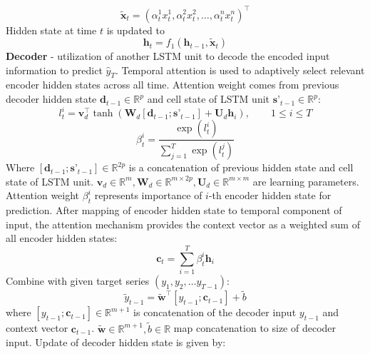 \documentclass{article}
\begin{document}
\begin{equation}
    \tilde{\textbf{x}}_{t} = (\alpha_{t}^{1}x_{t}^{1}, \alpha_{t}^{2}x_{t}^{2}, \hdots, \alpha_{t}^{n}x_{t}^{n})^{\intercal}
\end{equation}
Hidden state at time $t$ is updated to
\begin{equation}
    \textbf{h}_{t} = f_{1}(\textbf{h}_{t-1}, \tilde{\textbf{x}}_{t})
\end{equation}
\textbf{Decoder} - utilization of another LSTM unit to decode the encoded input information to predict $\hat{y}_{T}$. \newpage \noindent
Temporal attention is used to adaptively select relevant encoder hidden states across all time. Attention weight comes from previous decoder hidden state $\textbf{d}_{t-1} \in \mathbb{R}^{p}$ and cell state of LSTM unit $
\textbf{s'}_{t-1} \in \mathbb{R}^{p}$:
\begin{equation}
    l_{t}^{i} = \textbf{v}_{d}^{\intercal}\tanh(\textbf{W}_{d}[\textbf{d}_{t-1}; \textbf{s'}_{t-1}] + \textbf{U}_{d}\textbf{h}_{i}), \hspace{25pt} 1 \leq i \leq T
\end{equation}
\begin{equation}
    \beta_{t}^{i} = \frac{ \exp(l_{t}^{i})}{\sum_{j=1}^{T} \exp(l_{t}^{j})}
\end{equation}
Where $[\textbf{d}_{t-1}; \textbf{s'}_{t-1}] \in \mathbb{R}^{2p}$ is a concatenation of previous hidden state and cell state of LSTM unit. $\textbf{v}_{d} \in \mathbb{R}^{m}, \textbf{W}_{d} \in \mathbb{R}^{m \times 2p}, \textbf{U}_{d} \in \mathbb{R}^{m \times m}$ are learning parameters. Attention weight $\beta_{t}^{i}$ represents importance of $i$-th encoder hidden state for prediction. \newline
After mapping of encoder hidden state to temporal component of input, the attention mechanism provides the context vector as a weighted sum of all encoder hidden states:
\begin{equation}
    \textbf{c}_{t} = \sum_{i=1}^{T} \beta_{t}^{i}\textbf{h}_{i}
\end{equation}
Combine with given target series $(y_{1}, y_{2}, \hdots y_{T-1})$:
\begin{equation}
    \tilde{y}_{t-1} = \tilde{\textbf{w}}^{\intercal}[y_{t-1}; \textbf{c}_{t-1}] + \tilde{b}
\end{equation}
where $[y_{t-1}; \textbf{c}_{t-1}] \in \mathbb{R}^{m+1}$ is concatenation of the decoder input $y_{t-1}$ and context vector $\textbf{c}_{t-1}$. $\tilde{\textbf{w}} \in \mathbb{R}^{m+1}, \tilde{b} \in \mathbb{R}$ map concatenation to size of decoder input. Update of decoder hidden state is given by:
\end{document}
